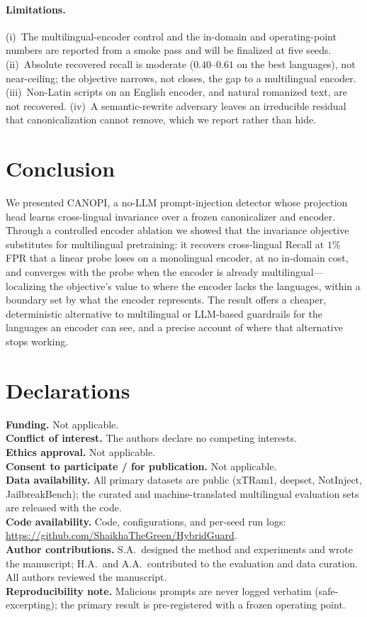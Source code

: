 \documentclass[pdflatex,sn-mathphys-num]{sn-jnl}
\theoremstyle{plain}
\begin{document}
\paragraph{Limitations.} (i)~The multilingual-encoder control and the in-domain and
operating-point numbers are reported from a smoke pass and will be finalized at five
seeds. (ii)~Absolute recovered recall is moderate ($0.40$--$0.61$ on the best
languages), not near-ceiling; the objective narrows, not closes, the gap to a
multilingual encoder. (iii)~Non-Latin scripts on an English encoder, and natural
romanized text, are not recovered. (iv)~A semantic-rewrite adversary leaves an
irreducible residual that canonicalization cannot remove, which we report rather
than hide.

\section{Conclusion}\label{sec:conclusion}
We presented CANOPI, a no-LLM prompt-injection detector whose projection head learns
cross-lingual invariance over a frozen canonicalizer and encoder. Through a
controlled encoder ablation we showed that the invariance objective substitutes for
multilingual pretraining: it recovers cross-lingual Recall at $1\%$ FPR that a linear
probe loses on a monolingual encoder, at no in-domain cost, and converges with the
probe when the encoder is already multilingual---localizing the objective's value to
where the encoder lacks the languages, within a boundary set by what the encoder
represents. The result offers a cheaper, deterministic alternative to multilingual
or LLM-based guardrails for the languages an encoder can see, and a precise account
of where that alternative stops working.

\section*{Declarations}
\noindent\textbf{Funding.} Not applicable.\\
\textbf{Conflict of interest.} The authors declare no competing interests.\\
\textbf{Ethics approval.} Not applicable.\\
\textbf{Consent to participate / for publication.} Not applicable.\\
\textbf{Data availability.} All primary datasets are public (xTRam1, deepset,
NotInject, JailbreakBench); the curated and machine-translated multilingual
evaluation sets are released with the code.\\
\textbf{Code availability.} Code, configurations, and per-seed run logs:
\url{https://github.com/ShaikhaTheGreen/HybridGuard}.\\
\textbf{Author contributions.} S.A.\ designed the method and experiments and wrote
the manuscript; H.A.\ and A.A.\ contributed to the evaluation and data curation. All
authors reviewed the manuscript.\\
\textbf{Reproducibility note.} Malicious prompts are never logged verbatim
(safe-excerpting); the primary result is pre-registered with a frozen operating
point.


\end{document}
